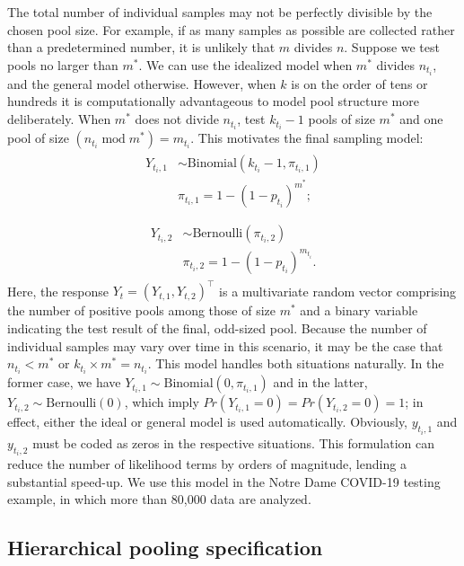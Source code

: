 \documentclass{article}
\begin{document}
The total number of individual samples may not be perfectly divisible by the chosen pool size. For example, if as many samples as possible are collected rather than a predetermined number, it is unlikely that $m$ divides $n$. Suppose we test pools no larger than $m^*$. We can use the idealized model when $m^*$ divides $n_{t_i}$, and the general model otherwise. However, when $k$ is on the order of tens or hundreds it is computationally advantageous to model pool structure more deliberately. When $m^*$ does not divide $n_{t_i}$, test $k_{t_i}-1$ pools of size $m^*$ and one pool of size $(n_{t_i} \;\mathrm{mod}\; m^*) = m_{t_i}$. This motivates the final sampling model:
\begin{align}
    \begin{split}
        Y_{t_i,1}&\sim \text{Binomial}(k_{t_i}-1, \pi_{t_i, 1})\\
        &\pi_{t_i, 1} = 1- (1-p_{t_i})^{m^*};\\
    \end{split}
\end{align}
\begin{align}
    \begin{split}
        Y_{t_i,2}&\sim \text{Bernoulli}(\pi_{t_i, 2})\\
        &\pi_{t_i, 2} = 1- (1-p_{t_i})^{m_{t_i}}.
    \end{split}
\end{align}
Here, the response $Y_t=(Y_{t,1}, Y_{t,2})^{\intercal}$ is a multivariate random vector comprising the number of positive pools among those of size $m^*$ and a binary variable indicating the test result of the final, odd-sized pool. Because the number of individual samples may vary over time in this scenario, it may be the case that $n_{t_i} < m^*$ or $k_{t_i} \times  m^* = n_{t_i}$. This model handles both situations naturally. In the former case, we have $Y_{t_i,1}\sim \text{Binomial}(0, \pi_{t_i, 1})$ and in the latter, $Y_{t_i,2}\sim \text{Bernoulli}(0)$, which imply $Pr(Y_{t_i,1} = 0) = Pr(Y_{t_i,2} = 0) = 1$; in effect, either the ideal or general model is used automatically. Obviously, $y_{t_i,1}$ and $y_{t_i,2}$ must be coded as zeros in the respective situations. This formulation can reduce the number of likelihood terms by orders of magnitude, lending a substantial speed-up. We use this model in the Notre Dame COVID-19 testing example, in which more than 80,000 data are analyzed. 

\subsection{Hierarchical pooling specification}
\end{document}
